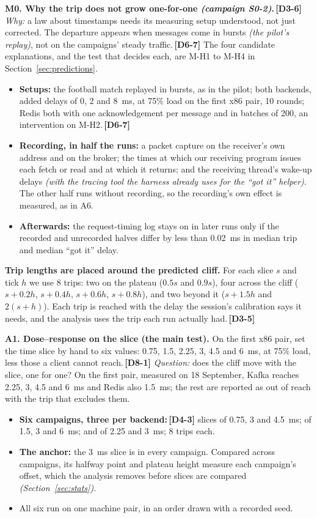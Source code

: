 \documentclass[11pt]{article}
\newcommand{\gl}[1]{{\color{soft}\itshape\small (#1)}}
\newcommand{\chgold}[1]{\,{\color{oldcol}\bfseries\footnotesize[#1]}}
\begin{document}
\textbf{M0. Why the trip does not grow one-for-one \gl{campaign S0-2}.}\chgold{D3-6} \emph{Why:} a law about timestamps needs its measuring setup understood, not just corrected. The departure appears when messages come in bursts \gl{the pilot's replay}, not on the campaigns' steady traffic.\chgold{D6-7} The four candidate explanations, and the test that decides each, are M-H1 to M-H4 in Section~\ref{sec:predictions}.
\begin{itemize}
  \item \textbf{Setups:} the football match replayed in bursts, as in the pilot; both backends, added delays of 0, 2 and 8~ms, at 75\% load on the first x86 pair, 10 rounds; Redis both with one acknowledgement per message and in batches of 200, an intervention on M-H2.\chgold{D6-7}
  \item \textbf{Recording, in half the runs:} a packet capture on the receiver's own address and on the broker; the times at which our receiving program issues each fetch or read and at which it returns; and the receiving thread's wake-up delays \gl{with the tracing tool the harness already uses for the ``got it'' helper}. The other half runs without recording, so the recording's own effect is measured, as in A6.
  \item \textbf{Afterwards:} the request-timing log stays on in later runs only if the recorded and unrecorded halves differ by less than 0.02~ms in median trip and median ``got it'' delay.
\end{itemize}

\textbf{Trip lengths are placed around the predicted cliff.} For each slice $s$ and tick $h$ we use 8 trips: two on the plateau ($0.5s$ and $0.9s$), four across the cliff ($s + 0.2h$, $s + 0.4h$, $s + 0.6h$, $s + 0.8h$), and two beyond it ($s + 1.5h$ and $2(s + h)$). Each trip is reached with the delay the session's calibration says it needs, and the analysis uses the trip each run actually had.\chgold{D3-5}

\textbf{A1. Dose--response on the slice (the main test).} On the first x86 pair, set the time slice by hand to six values: 0.75, 1.5, 2.25, 3, 4.5 and 6~ms, at 75\% load, less those a client cannot reach.\chgold{D8-1} \emph{Question:} does the cliff move with the slice, one for one? On the first pair, measured on 18 September, Kafka reaches 2.25, 3, 4.5 and 6~ms and Redis also 1.5~ms; the rest are reported as out of reach with the trip that excludes them.
\begin{itemize}
  \item \textbf{Six campaigns, three per backend:}\chgold{D4-3} slices of 0.75, 3 and 4.5~ms; of 1.5, 3 and 6~ms; and of 2.25 and 3~ms; 8 trips each.
  \item \textbf{The anchor:} the 3~ms slice is in every campaign. Compared across campaigns, its halfway point and plateau height measure each campaign's offset, which the analysis removes before slices are compared \gl{Section~\ref{sec:stats}}.
  \item All six run on one machine pair, in an order drawn with a recorded seed.
\end{itemize}
\end{document}
